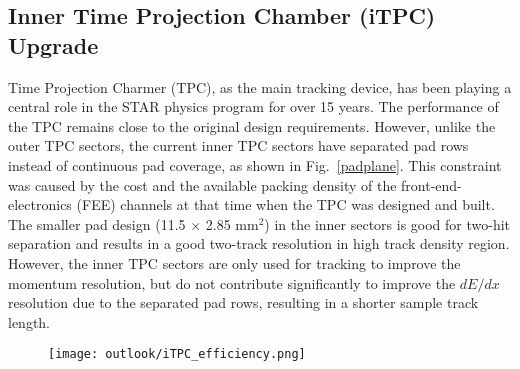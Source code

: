 \subsection{Inner Time Projection Chamber (iTPC) Upgrade}
Time Projection Charmer (TPC), as the main tracking device, has been playing a central role in the STAR physics program for over 15 years. The performance of the TPC remains close to the original design requirements. However, unlike the outer TPC sectors, the current inner TPC sectors have separated pad rows instead of continuous pad coverage, as shown in Fig.~\ref{padplane}. This constraint was caused by the cost and the available packing density of the front-end-electronics (FEE) channels at that time when the TPC was designed and built. The smaller pad design (11.5 $\times$ 2.85 mm$^{2}$) in the inner sectors is good for two-hit separation and results in a good two-track resolution in high track density region. However, the inner TPC sectors are only used for tracking to improve the momentum resolution, but do not contribute significantly to improve the $dE/dx$ resolution due to the separated pad rows, resulting in a shorter sample track length.

\begin{figure}[htbp]
\centering
\texttt{[image: outlook/iTPC\_efficiency.png]}
 \label{iTPCTrkEff}
\end{figure}

